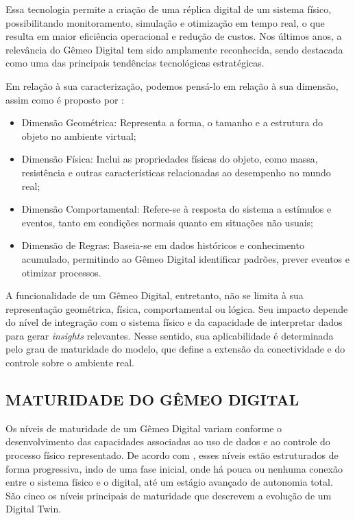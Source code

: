 \documentclass[
    12pt,                %
    openright,           %
    oneside,             %
    a4paper,             %
    english,             %
    spanish,             %
    brazil               %
]{ufscar}
\begin{document}
Essa tecnologia permite a criação de uma réplica digital de um sistema físico, possibilitando monitoramento, simulação e otimização em tempo real, o que resulta em maior eficiência operacional e redução de custos. Nos últimos anos, a relevância do Gêmeo Digital tem sido amplamente reconhecida, sendo destacada como uma das principais tendências tecnológicas estratégicas.

Em relação à sua caracterização, podemos pensá-lo em relação à sua dimensão, assim como é proposto por : 

\begin{itemize}
    \item Dimensão Geométrica: Representa a forma, o tamanho e a estrutura do objeto no ambiente virtual;
    \item Dimensão Física: Inclui as propriedades físicas do objeto, como massa, resistência e outras características relacionadas ao desempenho no mundo real;
    \item Dimensão Comportamental: Refere-se à resposta do sistema a estímulos e eventos, tanto em condições normais quanto em situações não usuais;
    \item Dimensão de Regras: Baseia-se em dados históricos e conhecimento acumulado, permitindo ao Gêmeo Digital identificar padrões, prever eventos e otimizar processos.
\end{itemize}


A funcionalidade de um Gêmeo Digital, entretanto, não se limita à sua representação geométrica, física, comportamental ou lógica. Seu impacto depende do nível de integração com o sistema físico e da capacidade de interpretar dados para gerar \textit{insights} relevantes. Nesse sentido, sua aplicabilidade é determinada pelo grau de maturidade do modelo, que define a extensão da conectividade e do controle sobre o ambiente real.


 \subsection{MATURIDADE DO GÊMEO DIGITAL}

Os níveis de maturidade de um Gêmeo Digital variam conforme o desenvolvimento das capacidades associadas ao uso de dados e ao controle do processo físico representado. De acordo com , esses níveis estão estruturados de forma progressiva, indo de uma fase inicial, onde há pouca ou nenhuma conexão entre o sistema físico e o digital, até um estágio avançado de autonomia total. São cinco os níveis principais de maturidade que descrevem a evolução de um Digital Twin.
\end{document}
